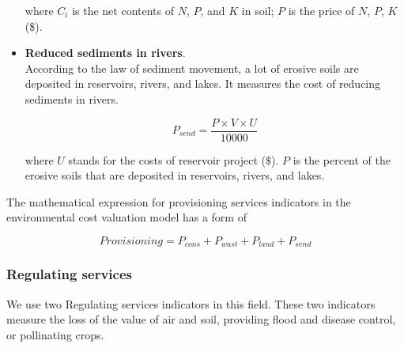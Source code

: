 \documentclass{mcmthesis}
\begin{document}
\begin{itemize}
					where $C_i$ is the net contents of $N$, $P$, and $K$ in soil; $P$ is the price of $N$, $P$, $K$ (\$).
						
						
					
					\item \textbf{Reduced sediments in rivers}. \\
					According to the law of sediment movement, a lot of erosive soils are deposited in reservoirs, rivers, and lakes. It measures the cost of reducing sediments in rivers.
					
					\begin{equation}
					P _ { send } = \frac { P \times V \times U } { 10000 }
					\end{equation}
					
					\noindent
					where $U$ stands for the costs of reservoir project ($\$$). $P$ is the percent of the erosive soils that are deposited in reservoirs, rivers, and lakes.
					
				\end{itemize}
			
				The mathematical expression for provisioning services indicators in the environmental cost valuation model has a form of
				
				\begin{equation}
					Provisioning = P_{cons} + P_{wast} + P_{land} + P_{send}
				\end{equation}
			
			
				
			\subsubsection{Regulating services}
			
				We use two Regulating services indicators in this field. These two indicators measure the loss of the value of air and soil, providing flood and disease control, or pollinating crops.
				
\end{document}
